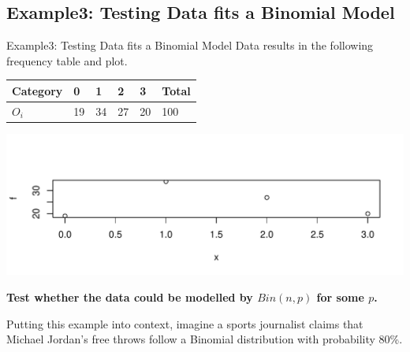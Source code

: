 \documentclass[t,xcolor=pdftex,dvipsnames,table]{beamer}
\makeatletter
\def\maxwidth{ %
  \ifdim\Gin@nat@width>\linewidth
    \linewidth
  \else
    \Gin@nat@width
  \fi
}
\newenvironment{knitrout}{}{} %
\makeatother
\begin{document}
\subsection[GoodnessofFit]{Example3: Testing Data fits a Binomial Model}
\begin{frame}[fragile]{Example3: Testing Data fits a Binomial Model}
Data results in the following frequency table and plot. \\

\vspace{.5cm}
\begin{tabular}{l|lllll} 
Category & 0 & 1 & 2 & 3 & Total  \\ \hline
$O_{i}$ & 19 & 34 & 27 & 20 & 100    \\ \hline
\end{tabular}

\begin{knitrout}
\color{fgcolor}
\includegraphics[width=\maxwidth]{figure/unnamed-chunk-3-1} 

\end{knitrout}

{\bf Test whether the data could be modelled by $Bin(n,p)$ for some $p$.}
\end{frame}

\begin{frame}
Putting this example into context, imagine a sports journalist claims that Michael Jordan's free throws follow a Binomial distribution with probability 80\%.
\href{https://sahilmohnani.wordpress.com/tag/binomial/}{}
\href{https://www.youtube.com/watch?v=3lt1x-k3QGU}{}

\end{frame}
\end{document}
